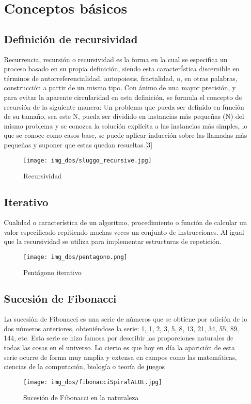 \documentclass[12pt,twoside]{article}
\begin{document}
\section{Conceptos básicos}
\subsection*{Definición de recursividad}
Recurrencia, recursión o recursividad es la forma en la cual se especifica un
proceso basado en su propia definición, siendo esta caracterÍstica discernible en
términos de autorreferencialidad, autopoiesis, fractalidad, o, en otras palabras,
construcción a partir de un mismo tipo. Con ánimo de una mayor precisión, y
para evitar la aparente circularidad en esta definición, se formula el concepto
de recursión de la siguiente manera:
Un problema que pueda ser definido en función de su tamaño, sea este N,
pueda ser dividido en instancias más pequeñas (N) del mismo problema y se
conozca la solución explícita a las instancias más simples, lo que se conoce
como casos base, se puede aplicar inducción sobre las llamadas más pequeñas y
suponer que estas quedan resueltas.[3]
\vspace{10 mm}
\begin{figure}[H]
\centering
\texttt{[image: img\_dos/sluggo\_recursive.jpg]}
\caption{Recursividad}
\end{figure}
\subsection*{Iterativo}
Cualidad o característica de un algoritmo, procedimiento o función de calcular
un valor especificado repitiendo muchas veces un conjunto de instrucciones.
Al igual que la recursividad se utiliza para implementar estructuras de repetición.
\begin{figure}[H]
\centering
\vspace{10 mm}
\texttt{[image: img\_dos/pentagono.png]}
\caption{Pentágono iterativo}
\end{figure}
\subsection*{Sucesión de Fibonacci}
La sucesión de Fibonacci es una serie de números que se obtiene por adición
de lo dos números anteriores, obteniéndose la serie: 1, 1, 2, 3, 5, 8, 13, 21, 34,
55, 89, 144, etc.
Esta serie se hizo famosa por describir las proporciones naturales de todas las
cosas en el universo. Lo cierto es que hoy en día la aparición de esta serie ocurre
de forma muy amplia y extensa en campos como las matemáticas, ciencias de
la computación, biología o teoría de juegos
\begin{figure}[H]
\centering
\vspace{10 mm}
\texttt{[image: img\_dos/fibonacciSpiralALOE.jpg]}
\caption{Sucesión de Fibonacci en la naturaleza}
\end{figure}
\vspace{100 mm}
\end{document}
